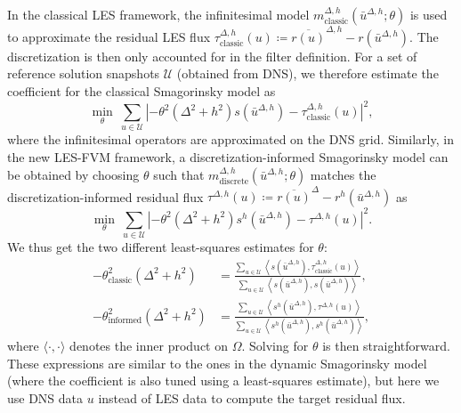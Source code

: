 \documentclass[preprint,twocolumn,5p]{elsarticle}
\begin{document}
In the classical LES framework,
the infinitesimal model
$m^{\Delta, h}_\text{classic}(\bar{u}^{\Delta, h}; \theta)$
is used to approximate the residual LES flux
$\tau^{\Delta, h}_\text{classic}(u) \coloneq
\overline{r(u)}^{\Delta, h} - r(\bar{u}^{\Delta, h})$.
The discretization is then only accounted for in the filter definition.
For a set of reference solution snapshots $\mathcal{U}$ (obtained from DNS),
we therefore estimate the coefficient for the classical Smagorinsky model as
\begin{equation}
    \min_\theta \
    \sum_{u \in \mathcal{U}}
    \left| -\theta^2 (\Delta^2 + h^2)
    s(\bar{u}^{\Delta, h}) - \tau^{\Delta, h}_\text{classic}(u) \right|^2,
\end{equation}
where the infinitesimal operators are approximated on the DNS grid.
Similarly, in the new LES-FVM framework, a discretization-informed Smagorinsky
model can be obtained by choosing $\theta$ such that
$m^{\Delta, h}_\text{discrete}(\bar{u}^{\Delta, h}; \theta)$ matches the
discretization-informed residual flux
$\tau^{\Delta, h}(u) \coloneq
\overline{r(u)}^\Delta - r^h(\bar{u}^{\Delta, h})$ as
\begin{equation}
    \min_\theta \
    \sum_{u \in \mathcal{U}}
    \left| -\theta^2 (\Delta^2 + h^2)
    s^h(\bar{u}^{\Delta, h}) - \tau^{\Delta, h}(u) \right|^2.
\end{equation}
We thus get the two different least-squares estimates for $\theta$:
\begin{align}
    -\theta^2_\text{classic} (\Delta^2 + h^2)
    & =
    \frac{
        \sum_{u \in \mathcal{U}}
        \left\langle
        s(\bar{u}^{\Delta, h}),
        \tau^{\Delta, h}_\text{classic}(u)
        \right\rangle
    }{
        \sum_{u \in \mathcal{U}}
        \left\langle
        s(\bar{u}^{\Delta, h}),
        s(\bar{u}^{\Delta, h})
        \right\rangle
    }, \\
    -\theta^2_\text{informed} (\Delta^2 + h^2)
    & = 
    \frac{
        \sum_{u \in \mathcal{U}}
        \left\langle
        s^h(\bar{u}^{\Delta, h}),
        \tau^{\Delta, h}(u)
        \right\rangle
    }{
        \sum_{u \in \mathcal{U}}
        \left\langle
        s^h(\bar{u}^{\Delta, h}),
        s^h(\bar{u}^{\Delta, h})
        \right\rangle
    },
\end{align}
where $\langle \cdot, \cdot \rangle$ denotes the inner product on $\Omega$.
Solving for $\theta$ is then straightforward.
These expressions are similar to the ones in the dynamic Smagorinsky model
(where the coefficient is also tuned using a least-squares estimate),
but here we use DNS data $u$ instead of LES data to compute the target residual flux.
\end{document}
